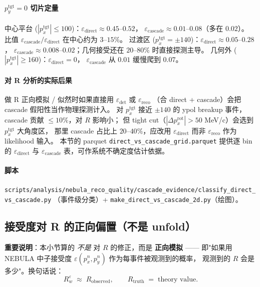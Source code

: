 \documentclass[a4paper,11pt]{ctexart}
\begin{document}
\paragraph{$p_y^\mathrm{tgt}=0$ 切片定量}
中心平台 ($|p_x^\mathrm{tgt}|\le 100$)：$\varepsilon_\mathrm{direct} \approx 0.45$--$0.52$，
$\varepsilon_\mathrm{cascade} \approx 0.01$--$0.08$（多在 $0.02$）。
比值 $\varepsilon_\mathrm{cascade}/\varepsilon_\mathrm{direct}$ 在中心约为 $3$--$15\%$。
过渡区 ($p_x^\mathrm{tgt}=\pm 140$)：$\varepsilon_\mathrm{direct}\approx 0.05$--$0.28$，
$\varepsilon_\mathrm{cascade}\approx 0.008$--$0.02$；几何接受还在 $20$--$80\%$ 时直接探测主导。
几何外 ($|p_x^\mathrm{tgt}| \ge 160$)：$\varepsilon_\mathrm{direct} = 0$，
$\varepsilon_\mathrm{cascade}$ 从 $0.01$ 缓慢爬到 $0.07$。

\paragraph{对 R 分析的实际后果}
做 R 正向模拟 / 似然时如果直接用 $\varepsilon_\mathrm{det}$ 或 $\varepsilon_\mathrm{reco}$
（合 direct + cascade）会把 cascade 假阳性当作物理探测计入。
对 $p_x^\mathrm{tgt}$ 接近 $\pm 140$ 的 ypol breakup 事件，cascade 贡献 $\le 10\%$，对 $R$ 影响小；
但 tight cut（$|\Delta p_x^\mathrm{rot}| > 50$ MeV/c）会选到 $p_x^\mathrm{tgt}$ 大角度区，
那里 cascade 占比上 $20$--$40\%$，应改用 $\varepsilon_\mathrm{direct}$ 而非 $\varepsilon_\mathrm{reco}$
作为 likelihood 输入。
本节的 parquet \texttt{direct\_vs\_cascade\_grid.parquet} 提供逐 bin 的 $\varepsilon_\mathrm{direct}$ 与
$\varepsilon_\mathrm{cascade}$ 表，可作系统不确定度估计依据。

\paragraph{脚本}
\texttt{scripts/analysis/nebula\_reco\_quality/cascade\_evidence/classify\_direct\_vs\_cascade.py}
（事件级分类）+ \texttt{make\_direct\_vs\_cascade\_2d.py}（绘图）。

\subsection{接受度对 R 的正向偏置（不是 unfold）}

\textbf{重要说明}：本小节算的 \emph{不是} 对 $R$ 的修正，而是 \textbf{正向模拟} ——
即"如果用 NEBULA 中子接受度 $\varepsilon(p_x^n, p_y^n)$ 作为每事件被观测到的概率，
观测到的 $R$ 会是多少"。换句话说：
$$R_w^{\varepsilon} \;\approx\; R_\mathrm{observed},
   \qquad R_\mathrm{truth} \;=\; \text{theory value}.$$
\end{document}
